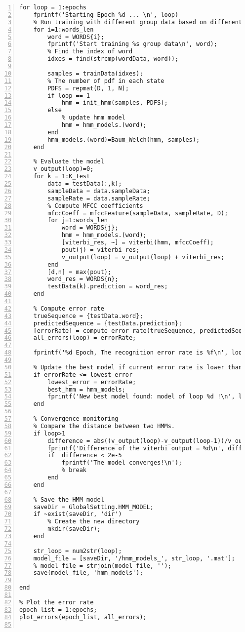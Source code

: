 \documentclass{article}
\begin{document}
\begin{lstlisting}[frame=single, numbers=left, style=Matlab-editor, caption={train\_model.m}, label={lst:train_model}]
for loop = 1:epochs
    fprintf('Starting Epoch %d ... \n', loop)
    % Run training with different group data based on different word.
    for i=1:words_len
        word = WORDS{i};
        fprintf('Start training %s group data\n', word);
        % Find the index of word
        idxes = find(strcmp(wordData, word));

        samples = trainData(idxes);
        % The number of pdf in each state
        PDFS = repmat(D, 1, N);
        if loop == 1
            hmm = init_hmm(samples, PDFS);
        else
            % update hmm model
            hmm = hmm_models.(word);
        end
        hmm_models.(word)=Baum_Welch(hmm, samples);
    end

    % Evaluate the model
    v_output(loop)=0;
    for k = 1:K_test
        data = testData(:,k);
        sampleData = data.sampleData;
        sampleRate = data.sampleRate;
        % Compute MFCC coefficients
        mfccCoeff = mfccFeature(sampleData, sampleRate, D);
        for j=1:words_len
            word = WORDS{j};
            hmm = hmm_models.(word);
            [viterbi_res, ~] = viterbi(hmm, mfccCoeff);
            pout(j) = viterbi_res;
            v_output(loop) = v_output(loop) + viterbi_res;
        end
        [d,n] = max(pout);
        word_res = WORDS{n};
        testData(k).prediction = word_res;
    end

    % Compute error rate
    trueSequence = {testData.word};
    predictedSequence = {testData.prediction};
    [errorRate] = compute_error_rate(trueSequence, predictedSequence);
    all_errors(loop) = errorRate;

    fprintf('%d Epoch, The recognition error rate is %f\n', loop, errorRate)

    % Update the best model if current error rate is lower than the best one
    if errorRate <= lowest_error
        lowest_error = errorRate;
        best_hmm = hmm_models;
        fprintf('New best model found: model of loop %d !\n', loop);
    end

    % Convergence monitoring
    % Compare the distance between two HMMs.
    if loop>1
        difference = abs((v_output(loop)-v_output(loop-1))/v_output(loop));
        fprintf('Difference of the viterbi output = %d\n', difference);
        if  difference < 2e-5
            fprintf('The model converges!\n');
            % break
        end
    end

    % Save the HMM model
    saveDir = GlobalSetting.HMM_MODEL;
    if ~exist(saveDir, 'dir')
        % Create the new directory
        mkdir(saveDir);
    end

    str_loop = num2str(loop);
    model_file = [saveDir, '/hmm_models_', str_loop, '.mat'];
    % model_file = strjoin(model_file, '');
    save(model_file, 'hmm_models');

end

% Plot the error rate
epoch_list = 1:epochs;
plot_errors(epoch_list, all_errors);


\end{lstlisting}
\end{document}
